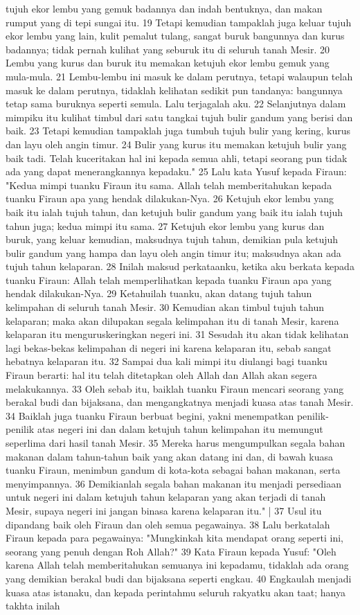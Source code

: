 \begin{biblechapter}
tujuh ekor lembu yang gemuk badannya dan indah bentuknya, dan makan rumput yang di tepi sungai itu. 19 Tetapi kemudian tampaklah juga keluar tujuh ekor lembu yang lain, kulit pemalut tulang, sangat buruk bangunnya dan kurus badannya; tidak pernah kulihat yang seburuk itu di seluruh tanah Mesir. 20 Lembu yang kurus dan buruk itu memakan ketujuh ekor lembu gemuk yang mula-mula. 21 Lembu-lembu ini masuk ke dalam perutnya, tetapi walaupun telah masuk ke dalam perutnya, tidaklah kelihatan sedikit pun tandanya: bangunnya tetap sama buruknya seperti semula. Lalu terjagalah aku. 22 Selanjutnya dalam mimpiku itu kulihat timbul dari satu tangkai tujuh bulir gandum yang berisi dan baik. 23 Tetapi kemudian tampaklah juga tumbuh tujuh bulir yang kering, kurus dan layu oleh angin timur. 24 Bulir yang kurus itu memakan ketujuh bulir yang baik tadi. Telah kuceritakan hal ini kepada semua ahli, tetapi seorang pun tidak ada yang dapat menerangkannya kepadaku." 25 Lalu kata Yusuf kepada Firaun: "Kedua mimpi tuanku Firaun itu sama. Allah telah memberitahukan kepada tuanku Firaun apa yang hendak dilakukan-Nya. 26 Ketujuh ekor lembu yang baik itu ialah tujuh tahun, dan ketujuh bulir gandum yang baik itu ialah tujuh tahun juga; kedua mimpi itu sama. 27 Ketujuh ekor lembu yang kurus dan buruk, yang keluar kemudian, maksudnya tujuh tahun, demikian pula ketujuh bulir gandum yang hampa dan layu oleh angin timur itu; maksudnya akan ada tujuh tahun kelaparan. 28 Inilah maksud perkataanku, ketika aku berkata kepada tuanku Firaun: Allah telah memperlihatkan kepada tuanku Firaun apa yang hendak dilakukan-Nya. 29 Ketahuilah tuanku, akan datang tujuh tahun kelimpahan di seluruh tanah Mesir. 30 Kemudian akan timbul tujuh tahun kelaparan; maka akan dilupakan segala kelimpahan itu di tanah Mesir, karena kelaparan itu menguruskeringkan negeri ini. 31 Sesudah itu akan tidak kelihatan lagi bekas-bekas kelimpahan di negeri ini karena kelaparan itu, sebab sangat hebatnya kelaparan itu. 32 Sampai dua kali mimpi itu diulangi bagi tuanku Firaun berarti: hal itu telah ditetapkan oleh Allah dan Allah akan segera melakukannya. 33 Oleh sebab itu, baiklah tuanku Firaun mencari seorang yang berakal budi dan bijaksana, dan mengangkatnya menjadi kuasa atas tanah Mesir. 34 Baiklah juga tuanku Firaun berbuat begini, yakni menempatkan penilik-penilik atas negeri ini dan dalam ketujuh tahun kelimpahan itu memungut seperlima dari hasil tanah Mesir. 35 Mereka harus mengumpulkan segala bahan makanan dalam tahun-tahun baik yang akan datang ini dan, di bawah kuasa tuanku Firaun, menimbun gandum di kota-kota sebagai bahan makanan, serta menyimpannya. 36 Demikianlah segala bahan makanan itu menjadi persediaan untuk negeri ini dalam ketujuh tahun kelaparan yang akan terjadi di tanah Mesir, supaya negeri ini jangan binasa karena kelaparan itu." | 37 Usul itu dipandang baik oleh Firaun dan oleh semua pegawainya. 38 Lalu berkatalah Firaun kepada para pegawainya: "Mungkinkah kita mendapat orang seperti ini, seorang yang penuh dengan Roh Allah?" 39 Kata Firaun kepada Yusuf: "Oleh karena Allah telah memberitahukan semuanya ini kepadamu, tidaklah ada orang yang demikian berakal budi dan bijaksana seperti engkau. 40 Engkaulah menjadi kuasa atas istanaku, dan kepada perintahmu seluruh rakyatku akan taat; hanya takhta inilah 
\end{biblechapter}

